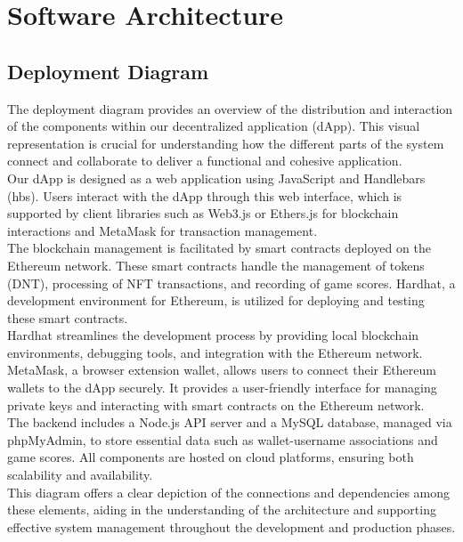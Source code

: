 \documentclass[main.tex]{subfiles}
\begin{document}
\section{Software Architecture}\label{sec:software_architecture}

\subsection{Deployment Diagram}

The deployment diagram provides an overview of the distribution and interaction of the components within our decentralized application (dApp). 
This visual representation is crucial for understanding how the different parts of the system connect and collaborate to deliver a functional and cohesive application.\\

Our dApp is designed as a web application using JavaScript and Handlebars (hbs). Users interact with the dApp through this web interface, which is supported by client 
libraries such as Web3.js or Ethers.js for blockchain interactions and MetaMask for transaction management.\\

The blockchain management is facilitated by smart contracts deployed on the Ethereum network. These smart contracts handle the management of tokens (DNT), processing 
of NFT transactions, and recording of game scores. Hardhat, a development environment for Ethereum, is utilized for deploying and testing these smart contracts.\\

Hardhat streamlines the development process by providing local blockchain environments, debugging tools, and integration with the Ethereum network.\\

MetaMask, a browser extension wallet, allows users to connect their Ethereum wallets to the dApp securely. It provides a user-friendly interface for managing private 
keys and interacting with smart contracts on the Ethereum network.\\

The backend includes a Node.js API server and a MySQL database, managed via phpMyAdmin, to store essential data such as wallet-username associations and game scores. 
All components are hosted on cloud platforms, ensuring both scalability and availability.\\

This diagram offers a clear depiction of the connections and dependencies among these elements, aiding in the understanding of the architecture and supporting 
effective system management throughout the development and production phases.
\end{document}
